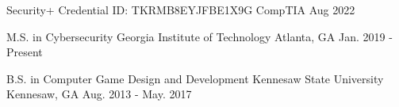 \documentclass[11pt, a4paper]{awesome-cv}
\begin{document}




\begin{cvhonors}

  \cvhonor
    {Security+} %
    {Credential ID: TKRMB8EYJFBE1X9G} %
    {CompTIA} %
    {Aug 2022} %

\end{cvhonors}



\begin{cventries}

  \cventry
    {M.S. in Cybersecurity} %
    {Georgia Institute of Technology} %
    {Atlanta, GA} %
    {Jan. 2019 - Present} %
    {
    }

  \cventry
    {B.S. in Computer Game Design and Development} %
    {Kennesaw State University} %
    {Kennesaw, GA} %
    {Aug. 2013 - May. 2017} %
    {
    }

\end{cventries}

\end{document}
